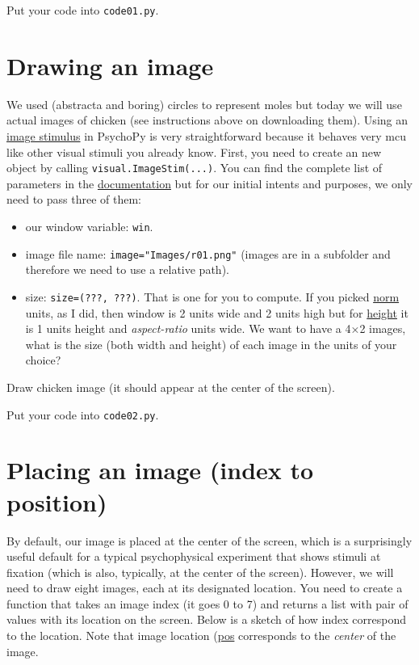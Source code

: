 \documentclass[
]{book}
\providecommand{\tightlist}{%
  \setlength{\itemsep}{0pt}\setlength{\parskip}{0pt}}
\begin{document}
Put your code into \texttt{code01.py}.

\hypertarget{imagestim}{%
\section{Drawing an image}\label{imagestim}}

We used (abstracta and boring) circles to represent moles but today we will use actual images of chicken (see instructions above on downloading them). Using an \href{https://psychopy.org/api/visual/imagestim.html}{image stimulus} in PsychoPy is very straightforward because it behaves very mcu like other visual stimuli you already know. First, you need to create an new object by calling \texttt{visual.ImageStim(...)}. You can find the complete list of parameters in the \href{(https://psychopy.org/api/visual/imagestim.html)}{documentation} but for our initial intents and purposes, we only need to pass three of them:

\begin{itemize}
\tightlist
\item
  our window variable: \texttt{win}.
\item
  image file name: \texttt{image="Images/r01.png"} (images are in a subfolder and therefore we need to use a relative path).
\item
  size: \texttt{size=(???,\ ???)}. That is one for you to compute. If you picked \protect\hyperlink{psychopy-units-norm}{norm} units, as I did, then window is 2 units wide and 2 units high but for \protect\hyperlink{psychopy-units-height}{height} it is 1 units height and \emph{aspect-ratio} units wide. We want to have a 4×2 images, what is the size (both width and height) of each image in the units of your choice?
\end{itemize}

Draw chicken image (it should appear at the center of the screen).

Put your code into \texttt{code02.py}.

\hypertarget{placing-an-image-index-to-position}{%
\section{Placing an image (index to position)}\label{placing-an-image-index-to-position}}

By default, our image is placed at the center of the screen, which is a surprisingly useful default for a typical psychophysical experiment that shows stimuli at fixation (which is also, typically, at the center of the screen). However, we will need to draw eight images, each at its designated location. You need to create a function that takes an image index (it goes 0 to 7) and returns a list with pair of values with its location on the screen. Below is a sketch of how index correspond to the location. Note that image location (\href{https://psychopy.org/api/visual/imagestim.html\#psychopy.visual.ImageStim.pos\%20attribute}{pos} corresponds to the \emph{center} of the image.
\end{document}
